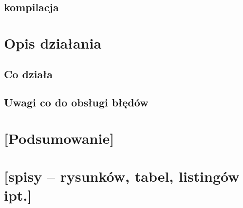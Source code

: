 \documentclass{article}
\begin{document}
\subsection{kompilacja}
\section{Opis działania}
\subsection{Co działa}
\subsection{Uwagi co do obsługi błędów}
\section{[Podsumowanie]}
\section{[spisy -- rysunków, tabel, listingów ipt.]}



\end{document}
